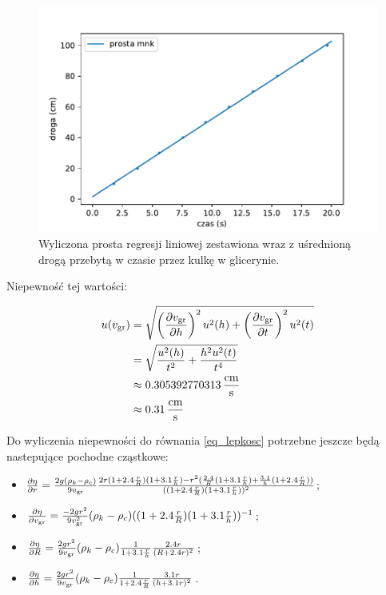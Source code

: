 \documentclass[a4paper]{article}
\begin{document}
\begin{figure}[h]
\centering
\includegraphics[scale=0.7]{regresja_gliceryna.pdf}
\caption{Wyliczona prosta regresji liniowej zestawiona wraz z uśrednioną drogą przebytą w czasie przez kulkę w glicerynie.}
\label{wykres_gliceryna}
\end{figure}

Niepewność tej wartości:

\begin{align*}
	u(v_{\text{gr}}) &= \sqrt{\left(\frac{\partial v_{\text{gr}}}{\partial h}\right)^2 u^2(h) + \left(\frac{\partial v_{\text{gr}}}{\partial t}\right)^2 u^2(t)} \\
	&= \sqrt{\frac{u^2(h)}{t^2} + \frac{h^2 u^2(t)}{t^4}} \\
	&\approx 0.305392770313 \, \frac{\text{cm}}{\text{s}} \\
	&\approx 0.31 \, \frac{\text{cm}}{\text{s}}
\end{align*}

Do wyliczenia niepewności do równania \ref{eq_lepkosc} potrzebne jeszcze będą nastepujące pochodne cząstkowe:

\begin{itemize}
	\item $\frac{\partial \eta}{\partial r} =
		\frac{2 g (\rho_k - \rho_c)}{9 v_{\text{gr}}}
		\frac{2 r (1 + 2.4 \frac rR) (1 + 3.1 \frac rh) - r^2 (\frac{2.4}{R}(1 + 3.1 \frac rh) + \frac{3.1}{h}(1 + 2.4 \frac rR))}{((1 + 2.4 \frac rR)(1 + 3.1 \frac rh))^2}$;
	\item $\frac{\partial \eta}{\partial v_{\text{gr}}} = \frac{-2 g r^2}{9 v_{\text{gr}}^2} (\rho_k - \rho_c) ((1 + 2.4 \frac rR) (1 + 3.1 \frac rh))^{-1}$;
	\item $\frac{\partial \eta}{\partial R} = \frac{2 g r^2}{9 v_{\text{gr}}} (\rho_k - \rho_c) \frac{1}{1 + 3.1 \frac rh} \frac{2.4r}{(R + 2.4 r)^2}$;
	\item $\frac{\partial \eta}{\partial h} = \frac{2 g r^2}{9 v_{\text{gr}}} (\rho_k - \rho_c) \frac{1}{1 + 2.4 \frac rR} \frac{3.1 r}{(h + 3.1 r)^2}$.
\end{itemize}
\end{document}

